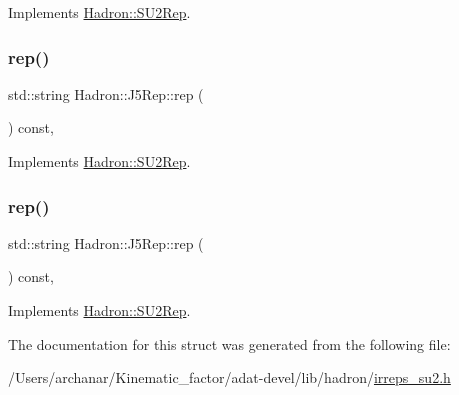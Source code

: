 Implements \mbox{\hyperlink{structHadron_1_1SU2Rep_a97c63ec12042453d3ac8e9ea612b2743}{Hadron\+::\+S\+U2\+Rep}}.

\mbox{\label{structHadron_1_1J5Rep_a21db8a3fe2ed5b61d05e4e9b0082fc37}} 
\subsubsection{\texorpdfstring{rep()}{rep()}\hspace{0.1cm}{\footnotesize\ttfamily [2/3]}}
{\footnotesize\ttfamily std\+::string Hadron\+::\+J5\+Rep\+::rep (\begin{DoxyParamCaption}{ }\end{DoxyParamCaption}) const\hspace{0.3cm}{\ttfamily [inline]}, {\ttfamily [virtual]}}



Implements \mbox{\hyperlink{structHadron_1_1SU2Rep_a97c63ec12042453d3ac8e9ea612b2743}{Hadron\+::\+S\+U2\+Rep}}.

\mbox{\label{structHadron_1_1J5Rep_a21db8a3fe2ed5b61d05e4e9b0082fc37}} 
\subsubsection{\texorpdfstring{rep()}{rep()}\hspace{0.1cm}{\footnotesize\ttfamily [3/3]}}
{\footnotesize\ttfamily std\+::string Hadron\+::\+J5\+Rep\+::rep (\begin{DoxyParamCaption}{ }\end{DoxyParamCaption}) const\hspace{0.3cm}{\ttfamily [inline]}, {\ttfamily [virtual]}}



Implements \mbox{\hyperlink{structHadron_1_1SU2Rep_a97c63ec12042453d3ac8e9ea612b2743}{Hadron\+::\+S\+U2\+Rep}}.



The documentation for this struct was generated from the following file\+:\begin{DoxyCompactItemize}
\item 
/\+Users/archanar/\+Kinematic\+\_\+factor/adat-\/devel/lib/hadron/\mbox{\hyperlink{adat-devel_2lib_2hadron_2irreps__su2_8h}{irreps\+\_\+su2.\+h}}\end{DoxyCompactItemize}
